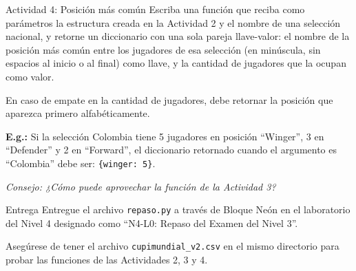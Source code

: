 \documentclass{ip-lab}
\begin{document}
\begin{sectionbox}{Actividad 4: Posición más común}
  Escriba una función que reciba como parámetros la estructura creada en la Actividad 2 y el nombre de una selección nacional, y retorne un diccionario con una sola pareja llave-valor: el nombre de la posición más común entre los jugadores de esa selección (en minúscula, sin espacios al inicio o al final) como llave, y la cantidad de jugadores que la ocupan como valor.

  En caso de empate en la cantidad de jugadores, debe retornar la posición que aparezca primero alfabéticamente.

  \textbf{E.g.:} Si la selección Colombia tiene 5 jugadores en posición ``Winger'', 3 en ``Defender'' y 2 en ``Forward'', el diccionario retornado cuando el argumento es ``Colombia'' debe ser: \texttt{\{\textquotedbl winger\textquotedbl: 5\}}.

  \textit{Consejo: ¿Cómo puede aprovechar la función de la Actividad 3?}
\end{sectionbox}

\begin{sectionbox}{Entrega}
  Entregue el archivo \texttt{repaso.py} a través de Bloque Neón en el laboratorio del Nivel 4 designado como ``N4-L0: Repaso del Examen del Nivel 3''.

  Asegúrese de tener el archivo \texttt{cupimundial\_v2.csv} en el mismo directorio para probar las funciones de las Actividades 2, 3 y 4.
\end{sectionbox}
\end{document}
